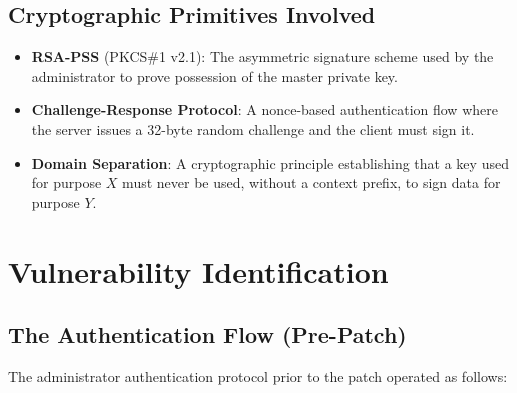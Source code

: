 \documentclass[12pt,a4paper]{article}
\begin{document}
\subsection{Cryptographic Primitives Involved}

\begin{itemize}
    \item \textbf{RSA-PSS} (PKCS\#1 v2.1): The asymmetric signature scheme used by the administrator to prove possession of the master private key.
    \item \textbf{Challenge-Response Protocol}: A nonce-based authentication flow where the server issues a 32-byte random challenge and the client must sign it.
    \item \textbf{Domain Separation}: A cryptographic principle establishing that a key used for purpose $X$ must never be used, without a context prefix, to sign data for purpose $Y$.
\end{itemize}

\section{Vulnerability Identification}

\subsection{The Authentication Flow (Pre-Patch)}

The administrator authentication protocol prior to the patch operated as follows:
\end{document}
